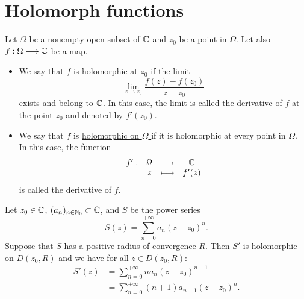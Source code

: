 \section{Holomorph functions}
\begin{definition}[]
Let $\Omega  $ be a nonempty open subset of $\mathbb{C}  $ and $z_0 $ be a point in $\Omega  $. Let also
$ f : \Omega  \longrightarrow \mathbb{C}  $ be a map. 
\begin{itemize}
  \item 
We say that $f $ is \underline{holomorphic} at $z_0 $ 
if the limit
\[
  \lim_{z \to z_0} \frac{f(z)  - f(z_0) }{z-z_0}
\]
exists and belong to $\mathbb{C}$. In this case, the limit is called the \underline{derivative} of $f $ at the point
$z_0 $ and denoted by $f'(z_0)  $. 
\end{itemize}
\begin{itemize}
  \item We say that $f $ is \underline{holomorphic on $\Omega  $ } if it is holomorphic at every point 
    in $\Omega  $. \\ In this case, the function
    \[
    \begin{array}{cccc}
          f' : &  \Omega   & \longrightarrow & \mathbb{C}  \\
    
               &  z  & \longmapsto     & f'(z)  \\ 
    \end{array}
    \]
    is called the derivative of $f$. 
\end{itemize}
\end{definition}
\begin{proposition}
  Let $z_0 \in  \mathbb{C}  $, $(a_n ) _{n \in   \mathbb{N}_0} \subset \mathbb{C} $, and $S $ be the power series
  \[
  S(z)  = \sum_{n=0}^{+\infty} a_n (z-z_0) ^n.
  \]
  Suppose that $S $ has a positive radius of convergence $R $. Then $S' $ is holomorphic on 
  $D(z_0, R)  $ and we have for all $z \in  D(z_0, R):$
  \begin{align*}
    S'(z)  &= \sum_{n=0}^{+\infty} n a_n (z-z_0) ^{n-1} \\
           &= \sum_{n=0}^{+\infty} (n+1) a_{n+1} (z-z_0) ^n .
  \end{align*}
\end{proposition}
